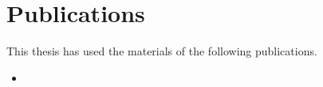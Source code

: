 \begingroup
\let\clearpage\relax
\let\cleardoublepage\relax
\let\cleardoublepage\relax

\chapter*{Publications}
This thesis has used the materials of the following publications.

\begin{itemize}
	\item
\end{itemize}
\endgroup

\vfill
